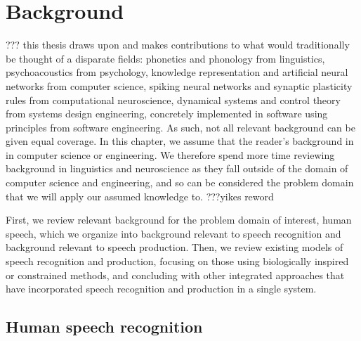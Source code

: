 \chapter{Background}

??? this thesis draws upon and makes contributions
to what would traditionally be thought of a disparate fields:
phonetics and phonology from linguistics,
psychoacoustics from psychology,
knowledge representation
and artificial neural networks from computer science,
spiking neural networks and
synaptic plasticity rules from computational neuroscience,
dynamical systems and control theory
from systems design engineering,
concretely implemented in software
using principles from software engineering.
As such, not all relevant background can
be given equal coverage.
In this chapter, we assume
that the reader's background
in in computer science or engineering.
We therefore spend more time
reviewing background in linguistics
and neuroscience as they fall outside
of the domain of computer science and engineering,
and so can be considered the problem domain
that we will apply our assumed knowledge to.
???yikes reword

First, we review relevant background
for the problem domain of interest,
human speech,
which we organize
into background relevant to speech recognition
and background relevant to speech production.
Then, we review existing models
of speech recognition and production,
focusing on those using
biologically inspired or constrained methods,
and concluding with other integrated approaches
that have incorporated speech recognition
and production in a single system.

\section{Human speech recognition}

